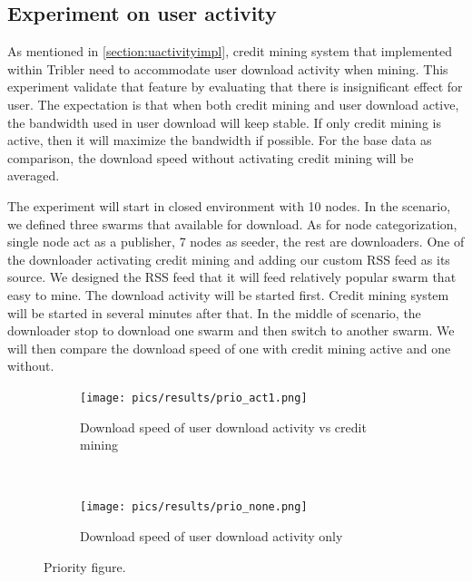 \clearpage
\subsection{Experiment on user activity}
As mentioned in \ref{section:uactivityimpl}, credit mining system that implemented within Tribler need to accommodate user download activity when mining. This experiment validate that feature by evaluating that there is insignificant effect for user. The expectation is that when both credit mining and user download active, the bandwidth used in user download will keep stable. If only credit mining is active, then it will maximize the bandwidth if possible. For the base data as comparison, the download speed without activating credit mining will be averaged.

The experiment will start in closed environment with 10 nodes. In the scenario, we defined three swarms that available for download. As for node categorization, single node act as a publisher, 7 nodes as seeder, the rest are downloaders. One of the downloader activating credit mining and adding our custom RSS feed as its source. We designed the RSS feed that it will feed relatively popular swarm that easy to mine. The download activity will be started first. Credit mining system will be started in several minutes after that. In the middle of scenario, the downloader stop to download one swarm and then switch to another swarm. We will then compare the download speed of one with credit mining active and one without. 


\begin{figure}[h!]
	\begin{adjustwidth}{-2cm}{}
		\begin{subfigure}[t]{0.6\textwidth}
				\texttt{[image: pics/results/prio\_act1.png]}
				\caption{Download speed of user download activity vs credit mining}
				\label{fig:cmpriomeanagg}
		\end{subfigure}
		~
		\begin{subfigure}[t]{0.6\textwidth}
			\centering
				\texttt{[image: pics/results/prio\_none.png]}
				\caption{Download speed of user download activity only}
				\label{fig:cmpriomean}
		\end{subfigure}
		\caption{Priority figure.}
	\end{adjustwidth}
\end{figure}

